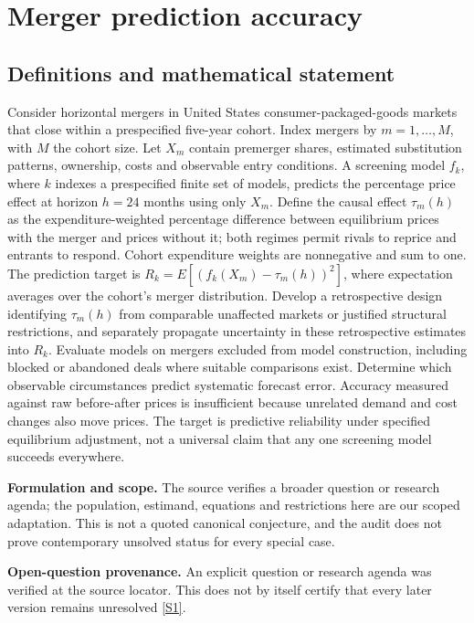 \documentclass[11pt]{article}
\newcommand{\sref}[2]{\hyperlink{source:#1:#2}{[S#2]}}
\begin{document}
\section*{Merger prediction accuracy}\label{30007674}
\subsection{Definitions and mathematical statement}
Consider horizontal mergers in United States consumer-packaged-goods markets that close within a prespecified five-year cohort. Index mergers by \(m=1,\ldots,M\), with \(M\) the cohort size. Let \(X_m\) contain premerger shares, estimated substitution patterns, ownership, costs and observable entry conditions. A screening model \(f_k\), where \(k\) indexes a prespecified finite set of models, predicts the percentage price effect at horizon \(h=24\) months using only \(X_m\). Define the causal effect \(\tau_m(h)\) as the expenditure-weighted percentage difference between equilibrium prices with the merger and prices without it; both regimes permit rivals to reprice and entrants to respond. Cohort expenditure weights are nonnegative and sum to one. The prediction target is \(R_k=E[(f_k(X_m)-\tau_m(h))^2]\), where expectation averages over the cohort's merger distribution. Develop a retrospective design identifying \(\tau_m(h)\) from comparable unaffected markets or justified structural restrictions, and separately propagate uncertainty in these retrospective estimates into \(R_k\). Evaluate models on mergers excluded from model construction, including blocked or abandoned deals where suitable comparisons exist. Determine which observable circumstances predict systematic forecast error. Accuracy measured against raw before-after prices is insufficient because unrelated demand and cost changes also move prices. The target is predictive reliability under specified equilibrium adjustment, not a universal claim that any one screening model succeeds everywhere.

\par\textbf{Formulation and scope.} The source verifies a broader question or research agenda; the population, estimand, equations and restrictions here are our scoped adaptation. This is not a quoted canonical conjecture, and the audit does not prove contemporary unsolved status for every special case.

\par\textbf{Open-question provenance.} An explicit question or research agenda was verified at the source locator. This does not by itself certify that every later version remains unresolved \sref{30007674}{1}.
\end{document}
